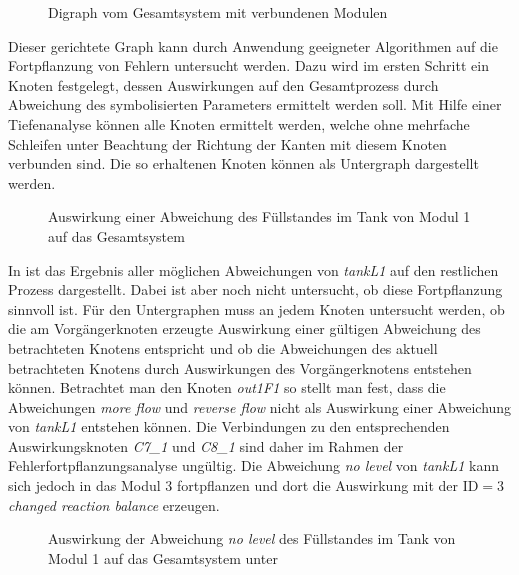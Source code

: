 \begin{figure}[h!tb]
\centering

%
\caption[Digraph gekoppeltes Gesamtsystems]{Digraph vom Gesamtsystem mit verbundenen Modulen}
\label{fig:graph_sysGesVerb}
\end{figure}

Dieser gerichtete Graph kann durch Anwendung geeigneter Algorithmen auf die Fortpflanzung von Fehlern untersucht werden. Dazu wird im ersten Schritt ein Knoten festgelegt, dessen Auswirkungen auf den Gesamtprozess durch Abweichung des symbolisierten Parameters ermittelt werden soll. Mit Hilfe einer Tiefenanalyse k\"onnen alle Knoten ermittelt werden, welche ohne mehrfache Schleifen unter Beachtung der Richtung der Kanten mit diesem Knoten verbunden sind. Die so erhaltenen Knoten k\"onnen als Untergraph dargestellt werden. 

\begin{figure}[h!tb]
\centering

\caption[Fehlerfortpflanzung im Gesamtsystem]{Auswirkung einer Abweichung des F\"ullstandes im Tank von Modul 1 auf das Gesamtsystem}
\label{fig:graph_sysGesFehlerfort}
\end{figure}

In  ist das Ergebnis aller m\"oglichen Abweichungen von \textit{tankL1} auf den restlichen Prozess dargestellt. Dabei ist aber noch nicht untersucht, ob diese Fortpflanzung sinnvoll ist. F\"ur den Untergraphen muss an jedem Knoten untersucht werden, ob die am Vorg\"angerknoten erzeugte Auswirkung einer g\"ultigen Abweichung des betrachteten Knotens entspricht und ob die Abweichungen des aktuell betrachteten Knotens durch Auswirkungen des Vorg\"angerknotens entstehen k\"onnen. Betrachtet man den Knoten \textit{out1F1} so stellt man fest, dass die Abweichungen \textit{more flow} und \textit{reverse flow} nicht als Auswirkung einer Abweichung von \textit{tankL1} entstehen k\"onnen. Die Verbindungen zu den entsprechenden Auswirkungsknoten \textit{C7{\_}1} und \textit{C8{\_}1} sind daher im Rahmen der Fehlerfortpflanzungsanalyse ung\"ultig. Die Abweichung \textit{no level} von \textit{tankL1} kann sich jedoch in das Modul 3 fortpflanzen und dort die Auswirkung mit der $\text{ID} = 3$ \textit{changed reaction balance} erzeugen. 

\begin{figure}[h!tb]
\centering

\caption[Fehlerfortpflanzung im Gesamtsystem gefiltert]{Auswirkung der Abweichung \textit{no level} des F\"ullstandes im Tank von Modul 1 auf das Gesamtsystem unter}
\label{fig:graph_sysGesFehlerfortNoLevel}
\end{figure}


